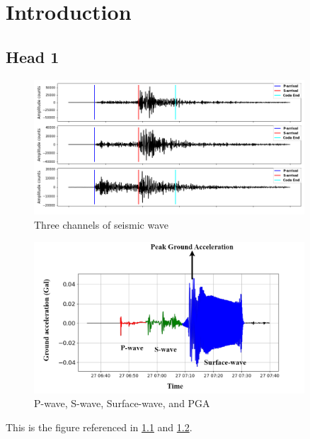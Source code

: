 \chapter{Introduction}\label{Chap:Intro}
\section{Head 1}
\lipsum[1]


\begin{figure}[ht]
    \centering
    \includegraphics[width=0.9\textwidth]{img/3ch.png}
    \caption{Three channels of seismic wave}
    \label{fig:3-wave}
\end{figure}

\lipsum[2]

\begin{figure}[ht]
    \centering
    \includegraphics[width=0.9\textwidth]{img/p-wave.png}
    \caption{P-wave, S-wave, Surface-wave, and PGA}
    \label{fig:p-wave}
\end{figure}

This is the figure referenced in \ref{fig:3-wave} and \ref{fig:p-wave}. 

